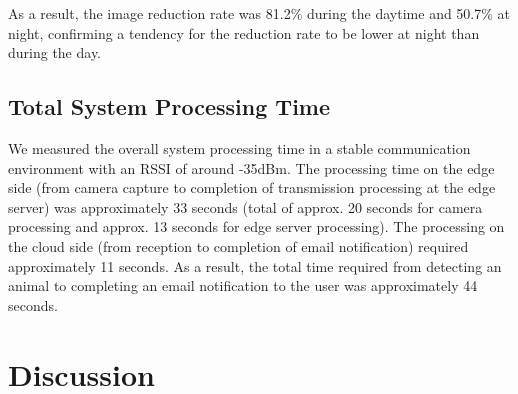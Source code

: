 \documentclass[conference]{IEEEtran}
\begin{document}
\begin{table}[tb]
    \caption{Image Reduction Rate by Day/Night}
    \label{tab:comm_reduction}
    \vspace{-0.2cm}
    \begin{center}\footnotesize
    \end{center}
    \vspace{-0.4cm}
\end{table}

As a result, the image reduction rate was 81.2\% during the daytime and 50.7\% at night, confirming a tendency for the reduction rate to be lower at night than during the day.

\subsection{Total System Processing Time}
We measured the overall system processing time in a stable communication environment with an RSSI of around -35dBm. The processing time on the edge side (from camera capture to completion of transmission processing at the edge server) was approximately 33 seconds (total of approx. 20 seconds for camera processing and approx. 13 seconds for edge server processing). The processing on the cloud side (from reception to completion of email notification) required approximately 11 seconds. As a result, the total time required from detecting an animal to completing an email notification to the user was approximately 44 seconds.

\section{Discussion}
\end{document}
